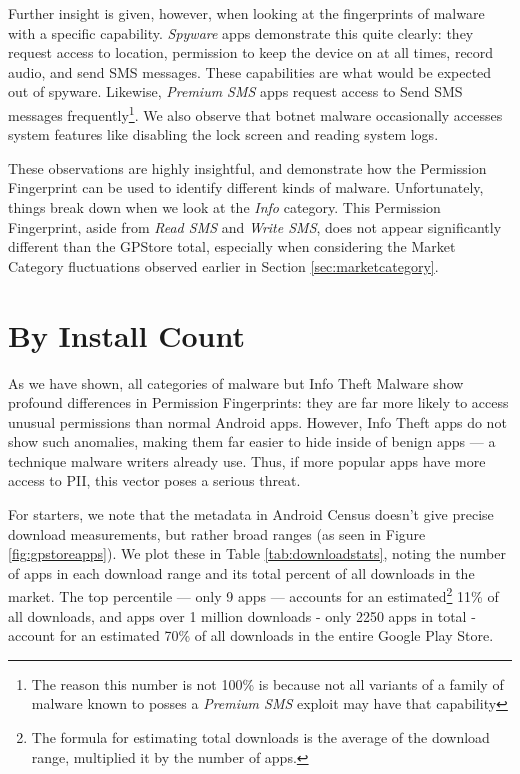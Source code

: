 Further insight is given, however, when looking at the fingerprints of malware with a specific capability. \textit{Spyware} apps demonstrate this quite clearly: they request access to location, permission to keep the device on at all times, record audio, and send SMS messages. These capabilities are what would be expected out of spyware. Likewise, \textit{Premium SMS} apps request access to Send SMS messages frequently\footnote{The reason this number is not 100\% is because not all variants of a family of malware known to posses a \textit{Premium SMS} exploit may have that capability}. We also observe that botnet malware occasionally accesses system features like disabling the lock screen and reading system logs.

These observations are highly insightful, and demonstrate how the Permission Fingerprint can be used to identify different kinds of malware. Unfortunately, things break down when we look at the \textit{Info} category. This Permission Fingerprint, aside from \textit{Read SMS} and \textit{Write SMS}, does not appear significantly different than the GPStore total, especially when considering the Market Category fluctuations observed earlier in Section \ref{sec:marketcategory}. 


\section{By Install Count}
As we have shown, all categories of malware but Info Theft Malware show profound differences in Permission Fingerprints: they are far more likely to access unusual permissions than normal Android apps. However, Info Theft apps do not show such anomalies, making them far easier to hide inside of benign apps --- a technique malware writers already use\citep{avastfakeapps}. Thus, if more popular apps have more access to PII, this vector poses a serious threat.

For starters, we note that the metadata in Android Census doesn't give precise download measurements, but rather broad ranges (as seen in Figure \ref{fig:gpstoreapps}). We plot these in Table \ref{tab:downloadstats}, noting the number of apps in each download range and its total percent of all downloads in the market. The top percentile --- only 9 apps --- accounts for an estimated\footnote{The formula for estimating total downloads is the average of the download range, multiplied it by the number of apps.} 11\% of all downloads, and apps over 1 million downloads - only 2250 apps in total - account for an estimated 70\% of all downloads in the entire Google Play Store.

